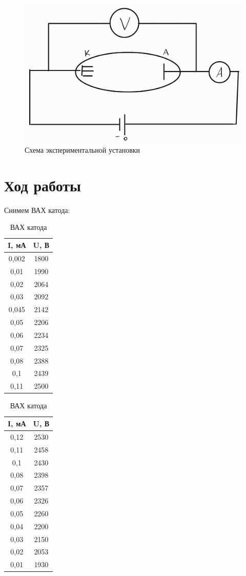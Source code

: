 \documentclass[a4paper,12pt]{article}
\theoremstyle{plain} %
\theoremstyle{definition} %
\theoremstyle{remark} %
\begin{document}
\begin{figure}[H]
	\centering
	\includegraphics[scale=0.2]{scheme.jpg}
	\caption{Схема экспериментальной установки}
	\label{pic2}
\end{figure}

\section{Ход работы}
 
Снимем ВАХ катода:

\begin{table}[H]
\begin{tabular}{|c|c|}
\hline
I, мА & U, В \\ \hline
0,002 & 1800 \\ \hline
0,01  & 1990 \\ \hline
0,02  & 2064 \\ \hline
0,03  & 2092 \\ \hline
0,045 & 2142 \\ \hline
0,05  & 2206 \\ \hline
0,06  & 2234 \\ \hline
0,07  & 2325 \\ \hline
0,08  & 2388 \\ \hline
0,1   & 2439 \\ \hline
0,11  & 2500 \\ \hline
\end{tabular}
\hspace{1cm}
\begin{tabular}{|c|c|}
\hline
I, мА & U, В \\ \hline
0,12  & 2530 \\ \hline
0,11  & 2458 \\ \hline
0,1   & 2430 \\ \hline
0,08  & 2398 \\ \hline
0,07  & 2357 \\ \hline
0,06  & 2326 \\ \hline
0,05  & 2260 \\ \hline
0,04  & 2200 \\ \hline
0,03  & 2150 \\ \hline
0,02  & 2053 \\ \hline
0,01  & 1930 \\ \hline
\end{tabular}
\caption{ВАХ катода}
\end{table}
\end{document}
